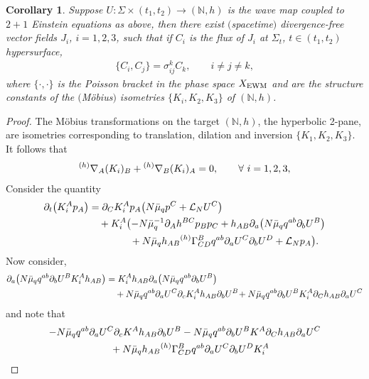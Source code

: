 \documentclass[pdftex]{sigma}
\def\ptl{\partial}%
\def\grad{{\nabla}}%
\newcommand{\leftexp}[2]{{\vphantom{#2}}^{#1}{#2}}
\numberwithin{equation}{section}
\newtheorem{Corollary}[Theorem]{Corollary}
\begin{document}
\begin{Corollary}
Suppose $U\colon \Sigma \times (t_1, t_2) \to (\mathbb{N}, h)$ is the wave map coupled to $2 + 1$ Einstein equations as above,
then there exist $($spacetime$)$ divergence-free vector fields $J_i$, $i =1, 2, 3$, such that if $C_i$ is the flux of $J_i$ at $\Sigma_t$, $t \in (t_1, t_2)$ hypersurface,
\begin{align*}
\{C_i, C_j \} = \sigma^{k}_{ij} C_k, \qquad i\neq j \neq k,
\end{align*}
where $\{ \cdot, \cdot \}$ is the Poisson bracket in the phase space $X_{{\rm EWM}}$ and  are the structure constants of the $($M\"obius$)$ isometries $\{ K_i, K_2, K_3\}$ of $(\mathbb{N}, h)$.
\end{Corollary}
\begin{proof}
The M\"obius transformations on the target $(\mathbb{N}, h)$, the hyperbolic 2-pane, are isometries corresponding to translation, dilation and inversion $\{ K_1, K_2, K_3 \}$. It follows that
\begin{align*}
\leftexp{(h)}{\grad}_A (K_i)_B + \leftexp{(h)}{\grad}_B (K_i)_A =0, \qquad \forall \ i = 1, 2, 3,
\end{align*}
Consider the quantity
\begin{align*}
\ptl_t \bigl(K^A_i p_A\bigr) &{}= \ptl_C K_i^A p_A \bigl(N \bar{\mu}_q p^C + \mathcal{L}_N U^C\bigr) \notag\\
&\quad{}+ K_i^A \bigl(-N \bar{\mu}^{-1}_q \ptl_A h^{BC} p_B p_C
+ h_{AB} \ptl_a \bigl(N \bar{\mu}_q q^{ab} \ptl_b U^B\bigr) \notag\\
&\quad\hphantom{+ K_i^A \bigl(\ }{}+ N \bar{\mu}_q h_{AB} \leftexp{(h)}{\Gamma}^B_{CD} q^{ab} \ptl_a U^C \ptl_b U^D + \mathcal{L}_N p_A \bigr).
\end{align*}
Now consider,
\begin{align*}
\ptl_a \bigl(N \bar{\mu}_q q^{ab} \ptl_b U^B K_i^A h_{AB}\bigr) &{}= K_i^A h_{AB} \ptl_a \bigl(N \bar{\mu}_q q^{ab} \ptl_b U^B\bigr) \notag\\
&\quad{}+ N \bar{\mu}_q q ^{ab} \ptl_a U^C \ptl_c K_i^A h_{AB} \ptl_b U^B\!
+ N \bar{\mu}_q q^{ab} \ptl_b U^B K_i^A \ptl_C h_{AB} \ptl_a U^C
\end{align*}
and note that
\begin{gather*}
 -N \bar{\mu}_q q ^{ab} \ptl_a U^C \ptl_c K^A h_{AB} \ptl_b U^B - N \bar{\mu}_q q^{ab} \ptl_b U^B K^A \ptl_C h_{AB} \ptl_a U^C \\
\quad{} + N \bar{\mu}_q h_{AB} \leftexp{(h)}{\Gamma}^B_{CD} q^{ab} \ptl_a U^C \ptl_b U^D K_i^A \\

\end{gather*}
\end{proof}
\end{document}
